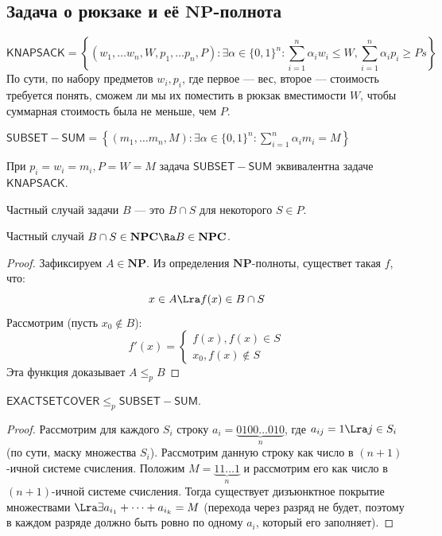 
\subsection{Задача о рюкзаке и её \(\mathbf{NP}\)-полнота}
\begin{definition}
    \[\mathsf{KNAPSACK} = \left\{(w_1, \dots w_n, W, p_1, \dots p_n, P): \exists \alpha \in \{0, 1\}^n: \sum_{i = 1}^n \alpha_iw_i \le W, \sum_{i = 1}^n \alpha_ip_i \ge Ps\right\}\]
    По сути, по набору предметов \(w_i, p_i\), где первое --- вес, второе --- стоимость требуется понять, сможем ли мы их поместить в рюкзак вместимости \(W\), чтобы суммарная стоимость была не меньше, чем \(P\).
\end{definition}

\begin{definition}
    \(\mathsf{SUBSET-SUM} = \left\{(m_1, \dots m_n, M): \exists \alpha \in \{0, 1\}^n: \sum_{i = 1}^n \alpha_im_i = M\right\}\)
\end{definition}

\begin{note}
    При \(p_i = w_i = m_i, P = W = M\) задача \(\mathsf{SUBSET-SUM}\) эквивалентна задаче \(\mathsf{KNAPSACK}\).
\end{note}

\begin{definition}
    Частный случай задачи \(B\) --- это \(B \cap S\) для некоторого \(S \in P\).
\end{definition}

\begin{proposition}
    Частный случай \(B \cap S \in \mathbf{NPC} \Ra B \in \mathbf{NPC}\).
\end{proposition}
\begin{proof}
    Зафиксируем \(A \in \mathbf{NP}\). Из определения \(\mathbf{NP}\)-полноты, существет такая \(f\), что:
    \[x \in A \Lra f(x) \in B \cap S\]
    Рассмотрим (пусть \(x_0 \notin B\)):
    \[f'(x) = \left\{\begin{array}{l}
        f(x), f(x) \in S \\
        x_0, f(x) \notin S
    \end{array}\right.\]
    Эта функция доказывает \(A \le_p B\)
\end{proof}

\begin{proposition}
    \(\mathsf{EXACTSETCOVER} \le_p \mathsf{SUBSET-SUM}\).
\end{proposition}
\begin{proof}
    Рассмотрим для каждого \(S_i\) строку \(a_i = \underbrace{0100\dots010}_n\), где \(a_{ij} = 1 \Lra j \in S_i\) (по сути, маску множества \(S_i\)). Рассмотрим данную строку как число в \((n + 1)\)-ичной системе счисления. Положим \(M = \underbrace{11\dots 1}_n\) и рассмотрим его как число в \((n + 1)\)-ичной системе счисления. Тогда существует дизъюнктное покрытие множествами \(\Lra \exists a_{i_1} + \dots + a_{i_k} = M\) (перехода через разряд не будет, поэтому в каждом разряде должно быть ровно по одному \(a_i\), который его заполняет).
\end{proof}

